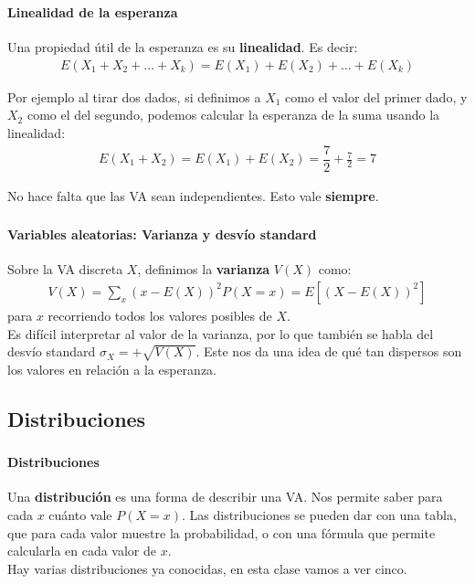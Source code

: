 \documentclass[../main.tex]{subfiles}
\begin{document}
\begin{frame}
  \frametitle{\SECTIONA}
  \framesubtitle{Linealidad de la esperanza}

  Una propiedad útil de la esperanza es su \textbf{linealidad}. Es decir:
  \begin{gather*}
    E(X_{1} + X_{2} + \ldots + X_{k}) = E(X_{1}) + E(X_{2}) + \ldots + E(X_{k})
  \end{gather*} \pause

  Por ejemplo al tirar dos dados, si definimos a \(X_{1}\) como el valor del primer dado, y \(X_{2}\) como el del segundo, podemos calcular la esperanza de la suma usando la linealidad:
  \begin{gather*}
    E(X_{1} + X_{2}) = E(X_{1}) + E(X_{2}) = \dfrac{7}{2} + \frac{7}{2} = 7
  \end{gather*} \pause

  No hace falta que las VA sean independientes. Esto vale \textbf{siempre}.
\end{frame}

\begin{frame}
  \frametitle{\SECTIONA}
  \framesubtitle{Variables aleatorias: Varianza y desvío standard}

  Sobre la VA discreta \(X\), definimos la \textbf{varianza} \(V(X)\) como:
  \begin{gather*}
    V(X) = \sum_{x}(x - E(X))^{2}P(X = x) = E[(X - E(X))^{2}]
  \end{gather*}
  para \(x\) recorriendo todos los valores posibles de \(X\). \pause \\
  Es difícil interpretar al valor de la varianza, por lo que también se habla del desvío standard \(\sigma_{X} = +\sqrt{V(X)}\). \pause Este nos da una idea de qué tan dispersos son los valores en relación a la esperanza.

\end{frame}

\subsection{Distribuciones}

\begin{frame}
  \frametitle{\SECTIONA}
  \framesubtitle{Distribuciones}

  Una \textbf{distribución} es una forma de describir una VA. Nos permite saber para cada \(x\) cuánto vale \(P(X = x)\). Las distribuciones se pueden dar con una tabla, que para cada valor muestre la probabilidad, o con una fórmula que permite calcularla en cada valor de \(x\). \pause \\
  Hay varias distribuciones ya conocidas, en esta clase vamos a ver cinco.
\end{frame}
\end{document}
